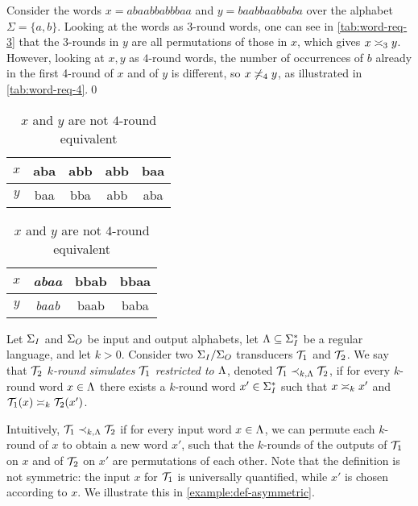\begin{example}
\label{example:word-req}
Consider the words $x=abaabbabbbaa$ and $y=baabbaabbaba$ over the alphabet $\Sigma=\{a,b\}$. Looking at the words as $3$-round words, one can see in \autoref{tab:word-req-3} that the 3-rounds in $y$ are all permutations of those in $x$, which gives $x\req[3] y$. However, looking at $x,y$ as $4$-round words, the number of occurrences of $b$ already in the first 4-round of $x$ and of $y$ is different, so $x\not\req[4] y$, as illustrated in \autoref{tab:word-req-4}.\qed
\begin{table}[!htb]
\begin{minipage}{.5\linewidth}
    \centering
    \begin{tabular}{c||c|c|c|c}
        $x$ & aba & abb & abb & baa \\
        \hline
        $y$ & baa & bba & abb & aba \\
    \end{tabular}
    \caption{$x$ and $y$ are $3$-round equivalent}
    \label{tab:word-req-3}
\end{minipage}%
\begin{minipage}{.5\linewidth}
    \centering
    \begin{tabular}{c||c|c|c}
        $x$ & \emph{abaa} & bbab & bbaa \\
        \hline
        $y$ & \emph{baab} & baab & baba \\
    \end{tabular}
    \caption{$x$ and $y$ are not $4$-round equivalent}
    \label{tab:word-req-4}
\end{minipage}
\end{table}
\end{example}

Let $\sI$ and $\sO$ be input and output alphabets, let $\fL\subseteq \sI^*$ be a regular language, and let $k>0$. Consider two $\sI/\sO$ transducers $\cT_1$ and $\cT_2$. We say that \emph{$\cT_2$ $k$-round simulates $\cT_1$ restricted to $\fL$}, denoted $\cT_1\prec_{k,\fL} \cT_2$, if for every $k$-round word $x\in \fL$ there exists a $k$-round word $x'\in \sI^*$ such that $x\req[k] x'$ and $\cT_1(x)\req[k] \cT_2(x')$. 

Intuitively, $\cT_1\prec_{k,\fL} \cT_2$ if for every input word $x\in \fL$, we can permute each $k$-round of $x$ to obtain a new word $x'$, such that the $k$-rounds of the outputs of $\cT_1$ on $x$ and of $\cT_2$ on $x'$ are permutations of each other. 
Note that the definition is not symmetric: the input $x$ for $\cT_1$ is universally quantified, while $x'$ is chosen according to $x$. We illustrate this in \autoref{example:def-asymmetric}.


